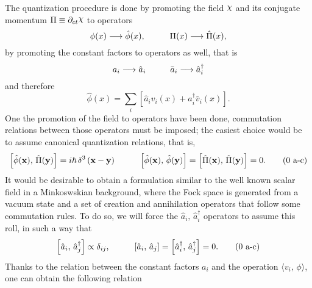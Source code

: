 The quantization procedure is done by promoting the field $\rchi$ and its conjugate momentum $\Pi\equiv\partial_{ct}\rchi$ to operators
\begin{equation*}
	\phi(x)\longrightarrow\hat{\phi}(x),\hspace{1.0cm}\Pi(x)\longrightarrow\hat{\Pi}(x),
\end{equation*}
by promoting the constant factors to operators as well, that is
\begin{equation*}
	a_i\longrightarrow\hat{a}_i\hspace{1.0cm}\bar a_i\longrightarrow\hat{a}_i^\dagger
\end{equation*}
and therefore
\begin{equation}
	\hat{\phi}(x)=\sum_i\left[\hat{a}_iv_i(x)+\hat{a}_i^\dagger \bar v_i(x)\right].
\end{equation}
One the promotion of the field to operators have been done, commutation relations between those operators must be imposed; the easiest choice would be to assume canonical quantization relations, that is,
\begin{subequations}\label{eq: General canonical commutator}
	\begin{gather}
		\left[\hat{\phi}(\mathbf{x}),\,\hat{\Pi}(\mathbf{y})\right]=i\hbar \,\delta^3\left(\mathbf{x}-\mathbf{y}\right)\hspace{1.0cm}\left[\hat{\phi}(\mathbf{x}),\,\hat{\phi}(\mathbf{y})\right]=\left[\hat{\Pi}(\mathbf{x}),\,\hat{\Pi}(\mathbf{y})\right]=0.\tag{\theequation \,\,a-c}
	\end{gather}
\end{subequations}
It would be desirable to obtain a formulation similar to the well known scalar field in a Minkoswskian background, where the Fock space is generated from a vacuum state and a set of creation and annihilation operators that follow some commutation rules. To do so, we will force the $\hat{a}_i,\,\hat{a}^\dagger_i$ operators to assume this roll, in such a way that
\begin{subequations}\label{eq: general a operator commutator rules}
	\begin{gather}
		\left[\hat{a}_i,\,\hat{a}_j^\dagger\right]\propto \delta_{ij},\hspace{1.0cm}\left[\hat{a}_i,\,\hat{a}_j\right]=\left[\hat{a}_i^\dagger,\,\hat{a}_j^\dagger\right]=0.\tag{\theequation \,\,a-c}
	\end{gather}
\end{subequations}
Thanks to the relation between the constant factors $a_i$ and the operation $\langle v_i,\,\phi\rangle$, one can obtain the following relation
